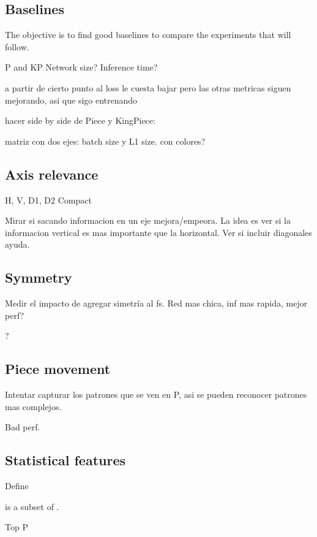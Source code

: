 \subsection{Baselines}

The objective is to find good baselines to compare the experiments that will follow.

P and KP
Network size?
Inference time?

a partir de cierto punto al loss le cuesta bajar pero las otras metricas siguen mejorando, asi que sigo entrenando

hacer side by side de Piece y KingPiece:

matriz con dos ejes: batch size y L1 size. con colores?

\subsection{Axis relevance}

H, V, D1, D2
Compact

Mirar si sacando informacion en un eje mejora/empeora. La idea es ver si la informacion vertical es mas importante que la horizontal. Ver si incluir diagonales ayuda.

\subsection{Symmetry}

Medir el impacto de agregar simetría al fs. Red mas chica, inf mas rapida, mejor perf?

?

\subsection{Piece movement}

Intentar capturar los patrones que se ven en P, asi se pueden reconocer patrones mas complejos.


Bad perf.

\subsection{Statistical features}

Define 

 is a subset of .

Top P

